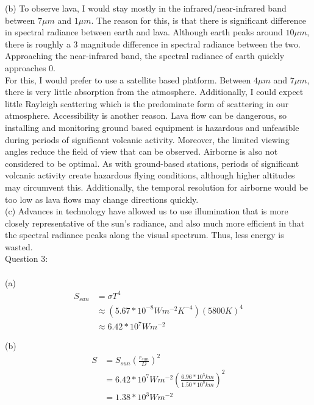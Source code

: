 \documentclass{homework}
\begin{document}
(b)
To observe lava, I would stay mostly in the infrared/near-infrared band between $7 \mu m$ and $1 \mu m$. The reason for this, is that there is significant difference in spectral radiance between earth and lava. Although earth peaks around $10 \mu m$, there is roughly a 3 magnitude difference in spectral radiance between the two. Approaching the near-infrared band, the spectral radiance of earth quickly approaches 0. \\

For this, I would prefer to use a satellite based platform. Between $4 \mu m$ and $7 \mu m$, there is very little absorption from the atmosphere. Additionally, I could expect little Rayleigh scattering which is the predominate form of scattering in our atmosphere. Accessibility is another reason. Lava flow can be dangerous, so installing and monitoring ground based equipment is hazardous and unfeasible during periods of significant volcanic activity. Moreover, the limited viewing angles reduce the field of view that can be observed. Airborne is also not considered to be optimal. As with ground-based stations, periods of significant volcanic activity create hazardous flying conditions, although higher altitudes may circumvent this. Additionally, the temporal resolution for airborne would be too low as lava flows may change directions quickly. \\

(c)
Advances in technology have allowed us to use illumination that is more closely representative of the sun's radiance, and also much more efficient in that the spectral radiance peaks along the visual spectrum. Thus, less energy is wasted. \\


Question 3: \\ \\
(a) 
\begin{equation*}
    \begin{split}
        S_{sun} 
        & = \sigma T^4 \\
        & \approx (5.67*10^{-8}Wm^{-2}K^{-4})(5800K)^4 \\
        & \approx 6.42*10^{7}Wm^{-2}
    \end{split}
\end{equation*}
    
    
(b)
\begin{equation*}
    \begin{split}
        S 
        & = S_{sun}(\frac{r_{sun}}{D})^2 \\
        & = 6.42*10^7 Wm^{-2}(\frac{6.96*10^5 km}{1.50*10^8 km})^2 \\
        & = 1.38*10^3 Wm^{-2}
    \end{split}
\end{equation*}
    
\end{document}
